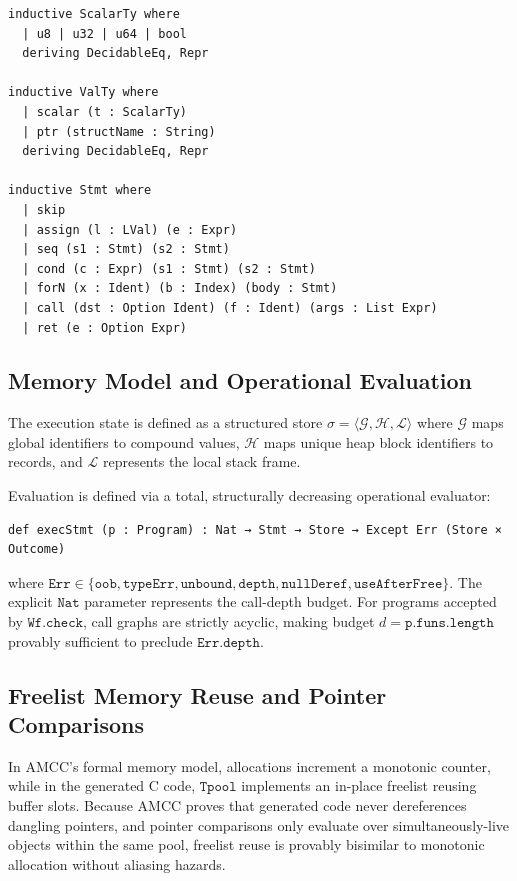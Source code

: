 \documentclass[11pt,a4paper]{article}
\begin{document}
\begin{lstlisting}[language=lean4]
inductive ScalarTy where
  | u8 | u32 | u64 | bool
  deriving DecidableEq, Repr

inductive ValTy where
  | scalar (t : ScalarTy)
  | ptr (structName : String)
  deriving DecidableEq, Repr

inductive Stmt where
  | skip
  | assign (l : LVal) (e : Expr)
  | seq (s1 : Stmt) (s2 : Stmt)
  | cond (c : Expr) (s1 : Stmt) (s2 : Stmt)
  | forN (x : Ident) (b : Index) (body : Stmt)
  | call (dst : Option Ident) (f : Ident) (args : List Expr)
  | ret (e : Option Expr)
\end{lstlisting}

\subsection{Memory Model and Operational Evaluation}

The execution state is defined as a structured store $\sigma = \langle \mathcal{G}, \mathcal{H}, \mathcal{L} \rangle$ where $\mathcal{G}$ maps global identifiers to compound values, $\mathcal{H}$ maps unique heap block identifiers to records, and $\mathcal{L}$ represents the local stack frame.

Evaluation is defined via a total, structurally decreasing operational evaluator:
\begin{lstlisting}[language=lean4]
def execStmt (p : Program) : Nat → Stmt → Store → Except Err (Store × Outcome)
\end{lstlisting}
where $\mathtt{Err} \in \{\mathtt{oob}, \mathtt{typeErr}, \mathtt{unbound}, \mathtt{depth}, \mathtt{nullDeref}, \mathtt{useAfterFree}\}$. The explicit $\mathtt{Nat}$ parameter represents the call-depth budget. For programs accepted by $\mathtt{Wf.check}$, call graphs are strictly acyclic, making budget $d = \mathtt{p.funs.length}$ provably sufficient to preclude $\mathtt{Err.depth}$.

\subsection{Freelist Memory Reuse and Pointer Comparisons}

In AMCC's formal memory model, allocations increment a monotonic counter, while in the generated C code, $\mathtt{Tpool}$ implements an in-place freelist reusing buffer slots. Because AMCC proves that generated code never dereferences dangling pointers, and pointer comparisons only evaluate over simultaneously-live objects within the same pool, freelist reuse is provably bisimilar to monotonic allocation without aliasing hazards.
\end{document}
